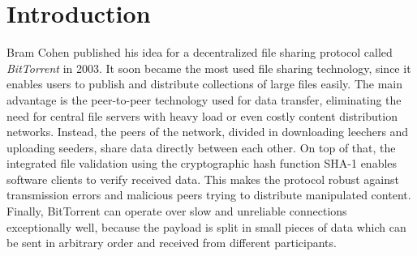 \documentclass[10pt, a4paper, twoside=false, headsepline]{scrbook}
\renewcommand{\_}{\origunderscore\allowbreak}
\begin{document}
\chapter{Introduction}
\pagestyle{scrheadings}
Bram Cohen published \cite{cohen2003incentives} his idea for a decentralized file sharing protocol called \emph{BitTorrent} in 2003. It soon became the most used file sharing technology, since it enables users to publish and distribute collections of large files easily. The main advantage is the peer-to-peer technology used for data transfer, eliminating the need for central file servers with heavy load or even costly content distribution networks. Instead, the peers of the network, divided in downloading leechers and uploading seeders, share data directly between each other. On top of that, the integrated file validation using the cryptographic hash function SHA-1 enables software clients to verify received data. This makes the protocol robust against transmission errors and malicious peers trying to distribute manipulated content. Finally, BitTorrent can operate over slow and unreliable connections exceptionally well, because the payload is split in small pieces of data which can be sent in arbitrary order and received from different participants.
\end{document}
